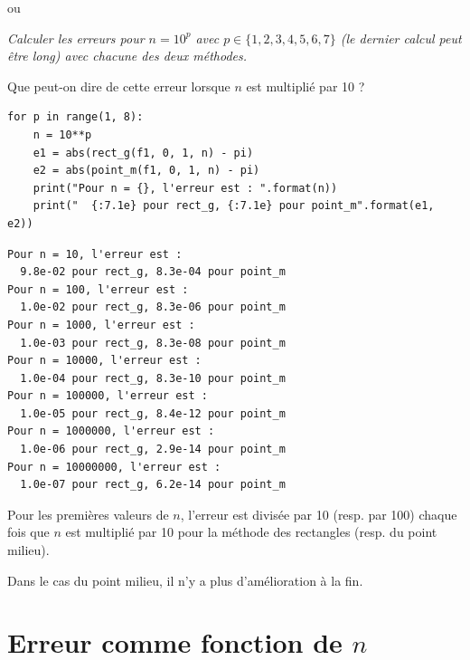  ou 
\begin{Exercise}\it
Calculer les erreurs pour $n=10^p$ avec $p\in\{1, 2, 3, 4, 5, 6, 7\}$ (le dernier calcul peut être long) avec chacune des deux méthodes.

Que peut-on dire de cette erreur lorsque $n$ est multiplié par 10 ?
\end{Exercise}
\begin{Answer}

\begin{lstlisting}
for p in range(1, 8):
    n = 10**p
    e1 = abs(rect_g(f1, 0, 1, n) - pi)
    e2 = abs(point_m(f1, 0, 1, n) - pi)
    print("Pour n = {}, l'erreur est : ".format(n))
    print("  {:7.1e} pour rect_g, {:7.1e} pour point_m".format(e1, e2))
\end{lstlisting}

\begin{lstlisting}
Pour n = 10, l'erreur est : 
  9.8e-02 pour rect_g, 8.3e-04 pour point_m
Pour n = 100, l'erreur est : 
  1.0e-02 pour rect_g, 8.3e-06 pour point_m
Pour n = 1000, l'erreur est : 
  1.0e-03 pour rect_g, 8.3e-08 pour point_m
Pour n = 10000, l'erreur est : 
  1.0e-04 pour rect_g, 8.3e-10 pour point_m
Pour n = 100000, l'erreur est : 
  1.0e-05 pour rect_g, 8.4e-12 pour point_m
Pour n = 1000000, l'erreur est : 
  1.0e-06 pour rect_g, 2.9e-14 pour point_m
Pour n = 10000000, l'erreur est : 
  1.0e-07 pour rect_g, 6.2e-14 pour point_m
\end{lstlisting}

Pour les premières valeurs de $n$, l'erreur est divisée par 10 (resp. par 100) chaque fois que $n$ est multiplié par 10 pour la méthode des rectangles (resp. du point milieu).

Dans le cas du point milieu, il n'y a plus d'amélioration à la fin.
\end{Answer}
\section{Erreur comme fonction de $n$}


